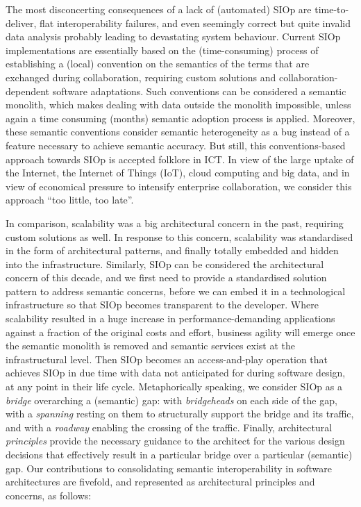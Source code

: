 \documentclass[a4paper,11pt,oneside,oldfontcommands]{memoir}
\theoremstyle{definition}
\theoremstyle{break}		%
\numberwithin{equation}{chapter}
\numberwithin{figure}{chapter}
\begin{document}
The most disconcerting consequences of a lack of (automated) SIOp are
time-to-deliver, flat interoperability failures, and even seemingly
correct but quite invalid data analysis probably leading to devastating
system behaviour. Current SIOp implementations are essentially based on
the (time-consuming) process of establishing a (local) convention on the
semantics of the terms that are exchanged during collaboration,
requiring custom solutions and collaboration-dependent software
adaptations. Such conventions can be considered a semantic monolith,
which makes dealing with data outside the monolith impossible, unless
again a time consuming (months) semantic adoption process is applied.
Moreover, these semantic conventions consider semantic heterogeneity as
a bug instead of a feature necessary to achieve semantic accuracy. But
still, this conventions-based approach towards SIOp is accepted folklore
in ICT. In view of the large uptake of the Internet, the Internet of
Things (IoT), cloud computing and big data, and in view of economical
pressure to intensify enterprise collaboration, we consider this
approach ``too little, too late''.

In comparison, scalability was a big architectural concern in the past,
requiring custom solutions as well. In response to this concern,
scalability was standardised in the form of architectural patterns, and
finally totally embedded and hidden into the infrastructure. Similarly,
SIOp can be considered the architectural concern of this decade, and we
first need to provide a standardised solution pattern to address
semantic concerns, before we can embed it in a technological
infrastructure so that SIOp becomes transparent to the developer. Where
scalability resulted in a huge increase in performance-demanding
applications against a fraction of the original costs and effort,
business agility will emerge once the semantic monolith is removed and
semantic services exist at the infrastructural level. Then SIOp becomes
an access-and-play operation that achieves SIOp in due time with data
not anticipated for during software design, at any point in their life
cycle. Metaphorically speaking, we consider SIOp as a \emph{bridge}
overarching a (semantic) gap: with \emph{bridgeheads} on each side of
the gap, with a \emph{spanning} resting on them to structurally support
the bridge and its traffic, and with a \emph{roadway} enabling the
crossing of the traffic. Finally, architectural \emph{principles}
provide the necessary guidance to the architect for the various design
decisions that effectively result in a particular bridge over a
particular (semantic) gap. Our contributions to consolidating semantic
interoperability in software architectures are fivefold, and represented
as architectural principles and concerns, as follows:
\end{document}
